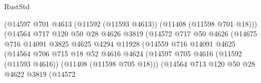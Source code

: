 \begin{lexlean}{RustStd}
\begin{coremodule}
                                          (@14597
                                            @701
                                            @4613
                                            (@11592 (@11593 @4613))
                                            (@11408 (@11598 @701 @18)))
                                          (@14564
                                            @717
                                            @120
                                            @50
                                            @28
                                            @4626
                                            @3819
                                            (@14572
                                              @717
                                              @50
                                              @4626
                                              (@14675
                                                @716
                                                @14091
                                                @3825
                                                @4625
                                                @4294
                                                @11928
                                                (@14559
                                                  @716
                                                  @14091
                                                  @4625
                                                  (@14564
                                                    @706
                                                    @715
                                                    @18
                                                    @52
                                                    @4616
                                                    @4624
                                                    (@14597
                                                      @705
                                                      @4616
                                                      (@11592 (@11593 @4616))
                                                      (@11408 (@11598 @705 @18)))
                                                    (@14564
                                                      @713
                                                      @120
                                                      @50
                                                      @28
                                                      @4622
                                                      @3819
                                                      (@14572

\end{coremodule}
\end{lexlean}
